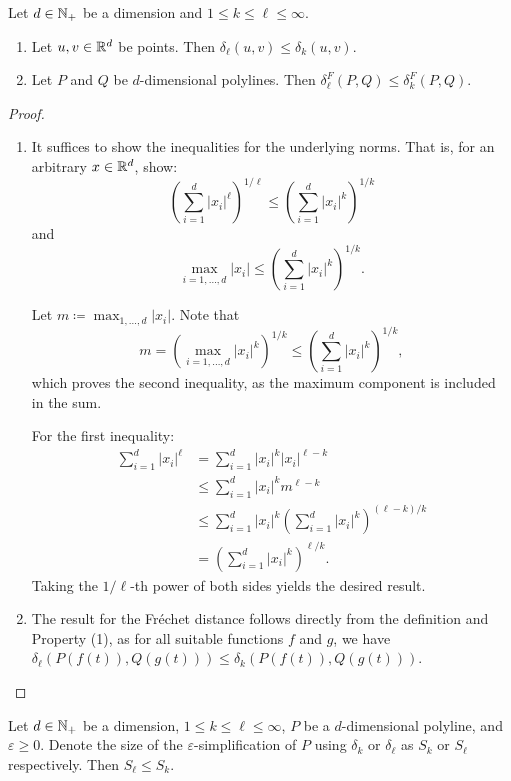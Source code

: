 \begin{lemma}\label{lem:monotonicity_minkowski}
  Let \(d \in \mathbb{N}_+\) be a dimension and \(1 \leq k \leq \ell \leq \infty\).
	\begin{enumerate}
		\item Let \(u, v \in \mathbb{R}^d\) be points. Then \(\delta_\ell(u,v) \leq \delta_k(u, v)\).
		\item Let \(P\) and \(Q\) be \(d\)-dimensional polylines. Then \(\delta_\ell^F(P, Q) \leq \delta_k^F(P, Q)\).
	\end{enumerate}
\end{lemma}

\begin{proof}
  \begin{enumerate}
		\item It suffices to show the inequalities for the underlying norms. That is, for an arbitrary \(x \in \mathbb{R}^d\), show:
			\[\left(\sum_{i=1}^d |x_i|^\ell\right)^{1/\ell} \leq \left(\sum_{i=1}^d |x_i|^k\right)^{1/k}\]
			and
			\[\max_{i=1, \dots, d} |x_i| \leq \left(\sum_{i=1}^d |x_i|^k\right)^{1/k}.\]

			Let \(m \coloneq \max_{1,\dots, d}|x_i|\). Note that
			\[m = \left(\max_{i=1, \dots, d} |x_i|^{k}\right)^{1/k} \leq \left(\sum_{i=1}^d |x_i|^{k}\right)^{1/k},\]
			which proves the second inequality, as the maximum component is included in the sum.

			For the first inequality:
			\begin{align*}
				\sum_{i=1}^d |x_i|^\ell &= \sum_{i=1}^d |x_i|^k|x_i|^{\ell - k} \\
				 &\leq \sum_{i=1}^d |x_i|^k m^{\ell - k} \\
				 &\leq \sum_{i=1}^d |x_i|^k \left(\sum_{i=1}^d |x_i|^{k}\right)^{(\ell-k)/k} \\
				 &= \left(\sum_{i=1}^d |x_i|^{k}\right)^{\ell/k}.
			\end{align*}
			Taking the \(1/\ell\)-th power of both sides yields the desired result.
		\item The result for the Fréchet distance follows directly from the definition and Property (1), as for all suitable functions \(f\) and \(g\), we have \(\delta_\ell(P(f(t)), Q(g(t))) \leq \delta_k(P(f(t)), Q(g(t)))\).
  \end{enumerate}
\end{proof}

\begin{corollary}\label{cor:size_monotonicity}
	Let \(d \in \mathbb{N}_+\) be a dimension, \(1 \leq k \leq \ell \leq \infty\),
  \(P\) be a \(d\)-dimensional polyline, and \(\varepsilon \geq 0\). Denote the size of the \(\varepsilon\)-simplification of \(P\) using \(\delta_k\) or \(\delta_\ell\) as \(S_k\) or \(S_\ell\) respectively. Then \(S_\ell \leq S_k\).
\end{corollary}

